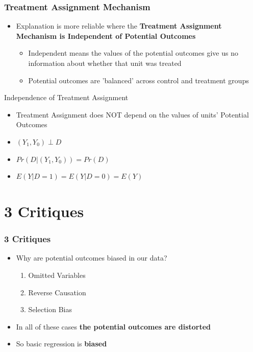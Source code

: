 \documentclass[xcolor=x11names,compress]{beamer}\usepackage[]{graphicx}\usepackage[]{xcolor}
\renewcommand{\(}{\begin{columns}}
\renewcommand{\)}{\end{columns}}
\newcommand{\<}[1]{\begin{column}{#1}}
\renewcommand{\>}{\end{column}}
\begin{document}
\begin{frame}
\frametitle{Treatment Assignment Mechanism}
\begin{itemize}
\item Explanation is more reliable where the \textbf{Treatment Assignment Mechanism is Independent of Potential Outcomes}
\pause
\begin{itemize}
\item Independent means the values of the potential outcomes give us no information about whether that unit was treated
\pause
\item Potential outcomes are 'balanced' across control and treatment groups
\pause
\end{itemize}
\end{itemize}
\begin{block}{Independence of Treatment Assignment}
\begin{itemize}
\item Treatment Assignment does NOT depend on the values of units' Potential Outcomes
\pause 
\item $(Y_1,Y_0) \perp D$
\pause
\item $Pr(D|(Y_1,Y_0)) = Pr(D)$
\pause
\item $E(Y|D=1) = E(Y|D=0) = E(Y)$
\end{itemize}
\end{block}
\end{frame}

\section{3 Critiques}

\begin{frame}
\frametitle{3 Critiques}
\begin{itemize}
\item Why are potential outcomes biased in our data?
\pause
\begin{enumerate}
\item Omitted Variables
\pause
\item Reverse Causation
\pause
\item Selection Bias
\pause
\end{enumerate}
\item In all of these cases \textbf{the potential outcomes are distorted}
\pause
\item So basic regression is \textbf{biased}
\end{itemize}
\end{frame}
\end{document}
